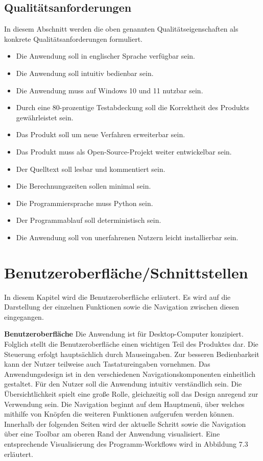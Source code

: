 \documentclass[parskip=full]{scrartcl} %
\begin{document}
\subsection{Qualitätsanforderungen}
In diesem Abschnitt werden die oben genannten Qualitätseigenschaften als konkrete Qualitätsanforderungen formuliert.

\begin{itemize}
    \item <Q1> Die Anwendung soll in englischer Sprache verfügbar sein.
    \item <Q2> Die Anwendung soll intuitiv bedienbar sein.
    \item <Q3> Die Anwendung muss auf Windows 10 und 11 nutzbar sein.
    \item <Q4> Durch eine 80-prozentige Testabdeckung soll die Korrektheit des Produkts gewährleistet sein.
    \item <Q5> Das Produkt soll um neue Verfahren erweiterbar sein.
    \item <Q6> Das Produkt muss als Open-Source-Projekt weiter entwickelbar sein.
    \item <Q7> Der Quelltext soll lesbar und kommentiert sein.
    \item <Q8> Die Berechnungszeiten sollen minimal sein.
    \item <Q9> Die Programmiersprache muss Python sein.
    \item <Q10> Der Programmablauf soll deterministisch sein.
    \item <Q11> Die Anwendung soll von unerfahrenen Nutzern leicht installierbar sein.
\end{itemize}

\newpage



\section{Benutzeroberfläche/Schnittstellen}
In diesem Kapitel wird die Benutzeroberfläche erläutert. Es wird auf die Darstellung der einzelnen Funktionen sowie die Navigation zwischen diesen eingegangen.

\textbf{Benutzeroberfläche}
Die Anwendung ist für Desktop-Computer konzipiert. Folglich stellt die Benutzeroberfläche einen wichtigen Teil des Produktes dar.
Die Steuerung erfolgt hauptsächlich durch Mauseingaben. Zur besseren Bedienbarkeit kann der Nutzer teilweise auch Tastatureingaben vornehmen. Das Anwendungsdesign ist in den verschiedenen Navigationskomponenten einheitlich gestaltet. Für den Nutzer soll die Anwendung intuitiv verständlich sein. Die Übersichtlichkeit spielt eine große Rolle, gleichzeitig soll das Design anregend zur Verwendung sein.
Die Navigation beginnt auf dem Hauptmenü, über welches mithilfe von Knöpfen die weiteren Funktionen aufgerufen werden können.
Innerhalb der folgenden Seiten wird der aktuelle Schritt sowie die Navigation über eine Toolbar am oberen Rand der Anwendung visualisiert. 
Eine entsprechende Visualisierung des Programm-Workflows wird in Abbildung 7.3 erläutert.
\end{document}

